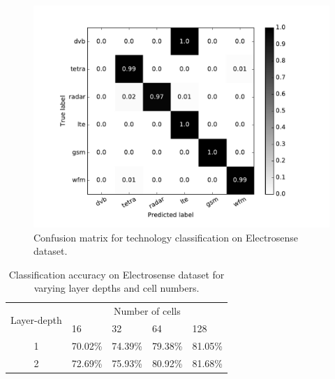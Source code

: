 \begin{figure}[!t]
\centering
\includegraphics[width=1.1\columnwidth]{figures/confmat_tech.pdf}
\caption{Confusion matrix for technology classification on Electrosense dataset.} 
\label{fig_confmat_tech}
\end{figure}

\begin{table}[!t]
\begin{center}
\begin{tabular}{|c|l|l|l|l|}
  \hline
  \multirow{2}{*}{Layer-depth} 
      & \multicolumn{4}{c|}{Number of cells} \\
      \cline{2-5}
  & 16 & 32 & 64 & 128 \\  \hline
  1 & 70.02\% & 74.39\% & 79.38\% & 81.05\%\\      \hline
  2 & 72.69\% & 75.93\% & 80.92\% & 81.68\%\\      \hline
\end{tabular}
\end{center}
\caption{Classification accuracy on Electrosense dataset for varying layer depths and cell numbers.}
\label{table_magfft_classif}
\end{table}

